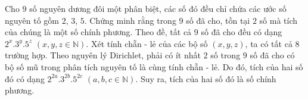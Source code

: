 \begin{ex}%
 Cho $9$ số nguyên dương đôi một phân biệt, các số đó đều chỉ chứa các ước số nguyên tố gồm $2$, $3$, $5$. Chứng minh rằng trong $9$ số đã cho, tồn tại $2$ số mà tích của chúng là một số chính phương.
\loigiai
{Theo đề, tất cả 9 số đã cho đều có dạng $2^x.3^y.5^z$  
	$(x, y,  z\in \mathbb{N})$.
    	Xét tính chẵn - lẻ của các bộ số $(x, y, z )$, ta có tất cả $8$ trường hợp.
    	Theo nguyên lý Dirichlet, phải có ít nhất $2$ số trong $9$ số đã cho có bộ số mũ trong phân tích nguyên tố là cùng tính chẵn - lẻ.
    	Do đó, tích của hai số đó có dạng $2^{2a}.3^{2b}.5^{2c}$  $(a, b,  c\in \mathbb{N})$.
    	Suy ra, tích của hai số đó là số chính phương.	
  }
\end{ex}

